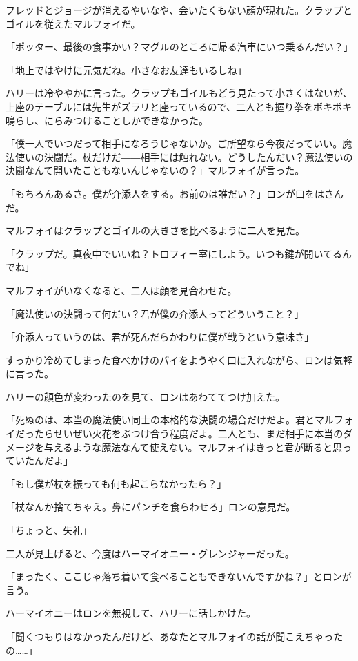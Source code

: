 \documentclass[10pt,a4paper]{article}
\begin{document}
\begin{CJK}{UTF8}{min}
フレッドとジョージが消えるやいなや、会いたくもない顔が現れた。クラップとゴイルを従えたマルフォイだ。

「ポッター、最後の食事かい？マグルのところに帰る汽車にいつ乗るんだい？」

「地上ではやけに元気だね。小さなお友達もいるしね」

ハリーは冷ややかに言った。クラップもゴイルもどう見たって小さくはないが、上座のテーブルには先生がズラリと座っているので、二人とも握り拳をボキボキ鳴らし、にらみつけることしかできなかった。

「僕一人でいつだって相手になろうじゃないか。ご所望なら今夜だっていい。魔法使いの決闘だ。杖だけだ――相手には触れない。どうしたんだい？魔法使いの決闘なんて開いたこともないんじゃないの？」マルフォイが言った。

「もちろんあるさ。僕が介添人をする。お前のは誰だい？」ロンが口をはさんだ。

マルフォイはクラップとゴイルの大きさを比べるように二人を見た。

「クラップだ。真夜中でいいね？トロフィー室にしよう。いつも鍵が開いてるんでね」

マルフォイがいなくなると、二人は顔を見合わせた。

「魔法使いの決闘って何だい？君が僕の介添人ってどういうこと？」

「介添人っていうのは、君が死んだらかわりに僕が戦うという意味さ」

すっかり冷めてしまった食べかけのパイをようやく口に入れながら、ロンは気軽に言った。

ハリーの顔色が変わったのを見て、ロンはあわててつけ加えた。

「死ぬのは、本当の魔法使い同士の本格的な決闘の場合だけだよ。君とマルフォイだったらせいぜい火花をぶつけ合う程度だよ。二人とも、まだ相手に本当のダメージを与えるような魔法なんて使えない。マルフォイはきっと君が断ると思っていたんだよ」

「もし僕が杖を振っても何も起こらなかったら？」

「杖なんか捨てちゃえ。鼻にパンチを食らわせろ」ロンの意見だ。

「ちょっと、失礼」

二人が見上げると、今度はハーマイオニー・グレンジャーだった。

「まったく、ここじゃ落ち着いて食べることもできないんですかね？」とロンが言う。

ハーマイオニーはロンを無視して、ハリーに話しかけた。

「聞くつもりはなかったんだけど、あなたとマルフォイの話が聞こえちゃったの……」


\end{CJK}
\end{document}
